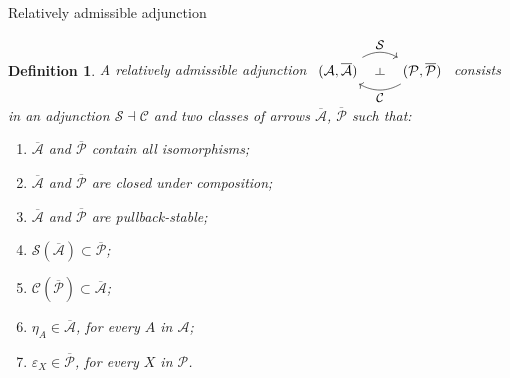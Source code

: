\documentclass[4pt]{beamer}
\newtheorem{defi}[teo]{Definition}
\begin{document}
\begin{frame}{Relatively admissible adjunction}
    \begin{defi}
        A relatively admissible adjunction 
        $\begin{tikzcd}[every label/.append style = {font = \small}, ampersand replacement=\&]
            (\mathcal{A},\overline{\mathcal{A}}) \arrow[r, bend left, "\mathcal{S}", ""{name=S}] \& (\mathcal{P},\overline{\mathcal{P}}) \arrow[l, bend left, "\mathcal{C}", ""{name=C}] \arrow[phantom, from=S, to=C, "\dashv" rotate=-90]
        \end{tikzcd}$ consists in an adjunction $\mathcal{S}\dashv\mathcal{C}$ and two classes of arrows $\overline{\mathcal{A}}$, $\overline{\mathcal{P}}$ such that:
        
        \vspace{1mm}
        
        \begin{enumerate}
            \item $\overline{\mathcal{A}}$ and $\overline{\mathcal{P}}$ contain all isomorphisms;
            \item $\overline{\mathcal{A}}$ and $\overline{\mathcal{P}}$ are closed under composition;
            \item $\overline{\mathcal{A}}$ and $\overline{\mathcal{P}}$ are pullback-stable;
            \item $\mathcal{S}(\overline{\mathcal{A}})\subset\overline{\mathcal{P}}$;
            \item $\mathcal{C}(\overline{\mathcal{P}})\subset\overline{\mathcal{A}}$;
            \item $\eta_A\in\overline{\mathcal{A}}$, for every $A$ in $\mathcal{A}$;
            \item $\varepsilon_X\in\overline{\mathcal{P}}$, for every $X$ in $\mathcal{P}$.
        \end{enumerate}
    \end{defi}
\end{frame}
\end{document}
